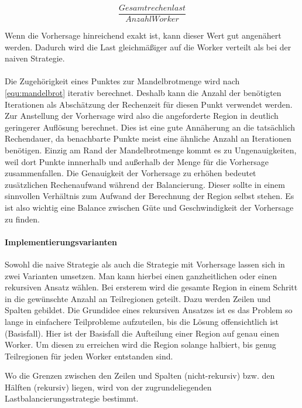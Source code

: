 \begin{equation}\label{equ:desiredN}
	\frac{Gesamtrechenlast}{AnzahlWorker}
\end{equation}

Wenn die Vorhersage hinreichend exakt ist, kann dieser Wert gut angenähert werden.
Dadurch wird die Last gleichmäßiger auf die Worker verteilt als bei der naiven Strategie.

\paragraph*{}\label{par:load_balancing_prediction}
Die Zugehörigkeit eines Punktes zur Mandelbrotmenge wird nach \autoref{equ:mandelbrot} iterativ berechnet.
Deshalb kann die Anzahl der benötigten Iterationen als Abschätzung der Rechenzeit für diesen Punkt verwendet werden.
Zur Anstellung der Vorhersage wird also die angeforderte Region in deutlich geringerer Auflösung berechnet.
Dies ist eine gute Annäherung an die tatsächlich Rechendauer, da benachbarte Punkte meist eine ähnliche Anzahl an Iterationen benötigen.
Einzig am Rand der Mandelbrotmenge kommt es zu Ungenauigkeiten, weil dort Punkte innnerhalb und außerhalb der Menge für die Vorhersage zusammenfallen.
Die Genauigkeit der Vorhersage zu erhöhen bedeutet zusätzlichen Rechenaufwand während der Balancierung.
Dieser sollte in einem sinnvollen Verhältnis zum Aufwand der Berechnung der Region selbst stehen.
Es ist also wichtig eine Balance zwischen Güte und Geschwindigkeit der Vorhersage zu finden.

\paragraph{Implementierungsvarianten}
Sowohl die naive Strategie als auch die Strategie mit Vorhersage lassen sich in zwei Varianten umsetzen.
Man kann hierbei einen ganzheitlichen oder einen rekursiven Ansatz wählen.
Bei ersterem wird die gesamte Region in einem Schritt in die gewünschte Anzahl an Teilregionen geteilt.
Dazu werden Zeilen und Spalten gebildet.
Die Grundidee eines rekursiven Ansatzes ist es das Problem so lange in einfachere Teilprobleme aufzuteilen, bis die Lösung offensichtlich ist (Basisfall).
Hier ist der Basisfall die Aufteilung einer Region auf genau einen Worker.
Um diesen zu erreichen wird die Region solange halbiert, bis genug Teilregionen für jeden Worker entstanden sind.

Wo die Grenzen zwischen den Zeilen und Spalten (nicht-rekursiv) bzw. den Hälften (rekursiv) liegen, wird von der zugrundeliegenden Lastbalancierungsstrategie bestimmt.

